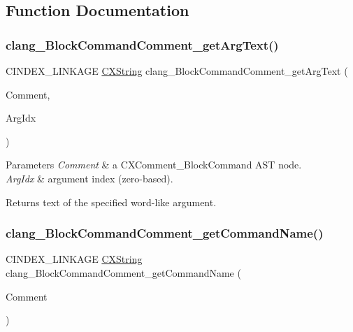 \subsection{Function Documentation}
\mbox{\label{group__CINDEX__COMMENT_ga9faf08601d88c809a9a97a9826051990}} 
\subsubsection{\texorpdfstring{clang\+\_\+\+Block\+Command\+Comment\+\_\+get\+Arg\+Text()}{clang\_BlockCommandComment\_getArgText()}}
{\footnotesize\ttfamily C\+I\+N\+D\+E\+X\+\_\+\+L\+I\+N\+K\+A\+GE \mbox{\hyperlink{structCXString}{C\+X\+String}} clang\+\_\+\+Block\+Command\+Comment\+\_\+get\+Arg\+Text (\begin{DoxyParamCaption}\item[{\mbox{\hyperlink{structCXComment}{C\+X\+Comment}}}]{Comment,  }\item[{unsigned}]{Arg\+Idx }\end{DoxyParamCaption})}


\begin{DoxyParams}{Parameters}
{\em Comment} & a {\ttfamily C\+X\+Comment\+\_\+\+Block\+Command} A\+ST node.\\
\hline
{\em Arg\+Idx} & argument index (zero-\/based).\\
\hline
\end{DoxyParams}
\begin{DoxyReturn}{Returns}
text of the specified word-\/like argument. 
\end{DoxyReturn}
\mbox{\label{group__CINDEX__COMMENT_ga8fdde998537370477362a4f84bc03420}} 
\subsubsection{\texorpdfstring{clang\+\_\+\+Block\+Command\+Comment\+\_\+get\+Command\+Name()}{clang\_BlockCommandComment\_getCommandName()}}
{\footnotesize\ttfamily C\+I\+N\+D\+E\+X\+\_\+\+L\+I\+N\+K\+A\+GE \mbox{\hyperlink{structCXString}{C\+X\+String}} clang\+\_\+\+Block\+Command\+Comment\+\_\+get\+Command\+Name (\begin{DoxyParamCaption}\item[{\mbox{\hyperlink{structCXComment}{C\+X\+Comment}}}]{Comment }\end{DoxyParamCaption})}


